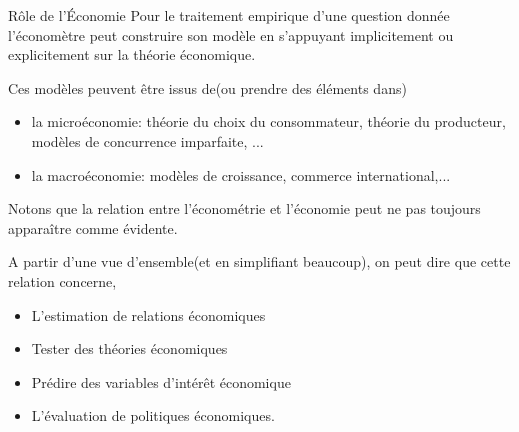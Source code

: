 \begin{frame}[allowframebreaks]{Rôle de l'\'Economie}
Pour le traitement empirique d'une question donnée l'économètre peut
construire son modèle en s'appuyant implicitement ou explicitement
sur la théorie économique.

\medskip

Ces modèles peuvent être issus de(ou prendre des éléments dans) 

\begin{itemize}
\item la microéconomie: théorie du choix du consommateur, théorie du
  producteur, modèles de concurrence imparfaite, ...
\item la macroéconomie: modèles de croissance, commerce international,...
\end{itemize}

\framebreak

Notons que  la relation entre l'économétrie et l'économie peut
ne pas toujours apparaître comme évidente. 

\medskip

A partir d'une vue d'ensemble(et en simplifiant beaucoup), on peut
dire que cette relation concerne,

\begin{itemize}
  \item L'estimation de relations économiques
  \item Tester des théories économiques
  \item Prédire des variables d'intérêt économique
  \item L'évaluation de politiques économiques.
  \end{itemize}

\end{frame}


